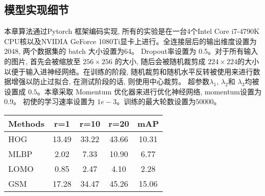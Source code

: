 \subsection{模型实现细节}
本章算法通过Pytorch 框架编码实现, 所有的实验是在一台4个Intel Core i7-4790K CPU核以及NVIDIA GeForce 1080Ti显卡上进行。全连接层后的输出维度设置为 2048, 两个数据集的 batch 大小设置为64。 Dropout率设置为 0.5。对于所有输入的图片, 首先会被缩放至 $256 \times 256$ 的大小, 随后会被随机裁剪成 $224 \times 224$的大小以便于输入进神经网络。在训练的阶段, 随机裁剪和随机水平反转被使用来进行数据增强以防止过拟合, 在测试阶段的话, 则使用中心裁剪。 超参数$\lambda_1$, $\lambda_2$和 $\lambda_3$均被设置成 $0.5$。本章采取 Momentum 优化器来进行优化神经网络, momentum设置为 $0.9$。 初使的学习速率设置为 $1e-3$。训练的最大轮数设置为$50000$。


\begin{table}[!htpb]
  \centering
  \begin{tabular}{cccccc}
     \\ \hline 
  \multicolumn{2}{l|}{Methods} & r=1  &r=10 & r=20 & mAP   \\\hline
  
  \multicolumn{2}{l|}{HOG} & 13.49 & 33.22 & 43.66 & 10.31  \\
  \multicolumn{2}{l|}{MLBP} &  2.02& 7.33 & 10.90 & 6.77  \\
  \multicolumn{2}{l|}{LOMO\cite{liao2015person}} &  0.85& 2.47 & 4.10 & 2.28  \\
  \multicolumn{2}{l|}{GSM\cite{lin2016cross}} &  17.28& 34.47 & 45.26 & 15.06  \\


\end{tabular}
\end{table}
